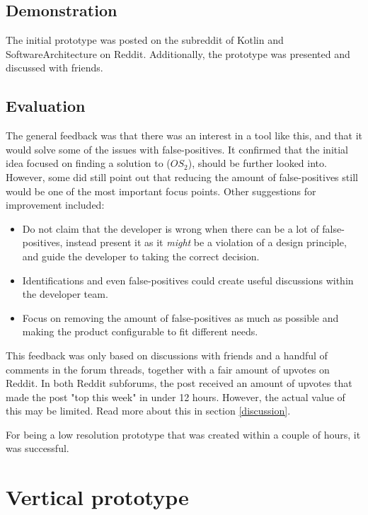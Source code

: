 \documentclass[pdftex,10pt,b5paper,twoside]{report}
\begin{document}
\subsection*{Demonstration}
The initial prototype was posted on the subreddit of Kotlin\cite{kotlin-reddit} and SoftwareArchitecture\cite{softwarearch-reddit} on Reddit. Additionally, the prototype was presented and discussed with friends. 

\subsection*{Evaluation}

The general feedback was that there was an interest in a tool like this, and that it would solve some of the issues with false-positives. It confirmed that the initial idea focused on finding a solution to (\(OS_{2}\)), should be further looked into. However, some did still point out that reducing the amount of false-positives still would be one of the most important focus points. Other suggestions for improvement included: 
\begin{itemize}
    \item Do not claim that the developer is wrong when there can be a lot of false-positives, instead present it as it \textit{might} be a violation of a design principle, and guide the developer to taking the correct decision.
    \item Identifications and even false-positives could create useful discussions within the developer team.
    \item Focus on removing the amount of false-positives as much as possible and making the product configurable to fit different needs.
  
\end{itemize}

This feedback was only based on discussions with friends and a handful of comments in the forum threads, together with a fair amount of upvotes on Reddit. In both Reddit subforums, the post received an amount of upvotes that made the post "top this week" in under 12 hours. However, the actual value of this may be limited. Read more about this in section \ref{discussion}. 

For being a low resolution prototype that was created within a couple of hours, it was successful.

\section{Vertical prototype}
\label{vertical-prototype}
\end{document}

